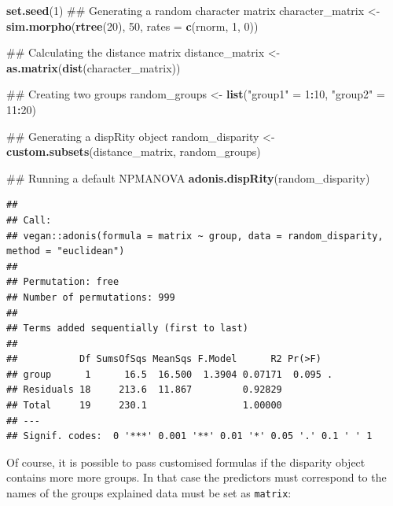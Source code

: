 \documentclass[]{book}
\newenvironment{Shaded}{\begin{snugshade}}{\end{snugshade}}
\newcommand{\KeywordTok}[1]{\textcolor[rgb]{0.13,0.29,0.53}{\textbf{#1}}}
\newcommand{\DataTypeTok}[1]{\textcolor[rgb]{0.13,0.29,0.53}{#1}}
\newcommand{\DecValTok}[1]{\textcolor[rgb]{0.00,0.00,0.81}{#1}}
\newcommand{\StringTok}[1]{\textcolor[rgb]{0.31,0.60,0.02}{#1}}
\newcommand{\OperatorTok}[1]{\textcolor[rgb]{0.81,0.36,0.00}{\textbf{#1}}}
\newcommand{\NormalTok}[1]{#1}
\theoremstyle{definition}
\theoremstyle{definition}
\theoremstyle{definition}
\theoremstyle{remark}
\begin{document}
\begin{Shaded}
\begin{Highlighting}[]
\KeywordTok{set.seed}\NormalTok{(}\DecValTok{1}\NormalTok{)}
\NormalTok{## Generating a random character matrix}
\NormalTok{character_matrix <-}\StringTok{ }\KeywordTok{sim.morpho}\NormalTok{(}\KeywordTok{rtree}\NormalTok{(}\DecValTok{20}\NormalTok{), }\DecValTok{50}\NormalTok{, }\DataTypeTok{rates =} \KeywordTok{c}\NormalTok{(rnorm, }\DecValTok{1}\NormalTok{, }\DecValTok{0}\NormalTok{))}

\NormalTok{## Calculating the distance matrix}
\NormalTok{distance_matrix <-}\StringTok{ }\KeywordTok{as.matrix}\NormalTok{(}\KeywordTok{dist}\NormalTok{(character_matrix))}

\NormalTok{## Creating two groups}
\NormalTok{random_groups <-}\StringTok{ }\KeywordTok{list}\NormalTok{(}\StringTok{"group1"}\NormalTok{ =}\StringTok{ }\DecValTok{1}\OperatorTok{:}\DecValTok{10}\NormalTok{, }\StringTok{"group2"}\NormalTok{ =}\StringTok{ }\DecValTok{11}\OperatorTok{:}\DecValTok{20}\NormalTok{)}

\NormalTok{## Generating a dispRity object}
\NormalTok{random_disparity <-}\StringTok{ }\KeywordTok{custom.subsets}\NormalTok{(distance_matrix, random_groups)}

\NormalTok{## Running a default NPMANOVA}
\KeywordTok{adonis.dispRity}\NormalTok{(random_disparity)}
\end{Highlighting}
\end{Shaded}

\begin{verbatim}
## 
## Call:
## vegan::adonis(formula = matrix ~ group, data = random_disparity,      method = "euclidean") 
## 
## Permutation: free
## Number of permutations: 999
## 
## Terms added sequentially (first to last)
## 
##           Df SumsOfSqs MeanSqs F.Model      R2 Pr(>F)  
## group      1      16.5  16.500  1.3904 0.07171  0.095 .
## Residuals 18     213.6  11.867         0.92829         
## Total     19     230.1                 1.00000         
## ---
## Signif. codes:  0 '***' 0.001 '**' 0.01 '*' 0.05 '.' 0.1 ' ' 1
\end{verbatim}

Of course, it is possible to pass customised formulas if the disparity
object contains more more groups. In that case the predictors must
correspond to the names of the groups explained data must be set as
\texttt{matrix}:
\end{document}
